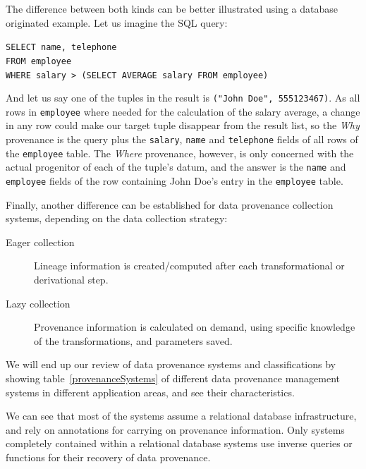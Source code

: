 		The difference between both kinds can be better illustrated
		using a database originated example.
		Let us imagine the SQL query:
		
		\begin{adjustwidth}{\parindent}{\parindent}
			\noindent\texttt{SELECT name, telephone\\
			FROM employee\\
			WHERE salary > (SELECT AVERAGE salary FROM employee)}
		\end{adjustwidth}
		
		 And let us say one of the tuples in the result is
		\texttt{("John Doe", 555123467)}. As all rows in
		\texttt{employee} where needed for the calculation of the
		salary average, a change in any row could make our target
		tuple disappear from the result list, so the \emph{Why}
		provenance is the query plus the \texttt{salary},
		\texttt{name} and \texttt{telephone} fields of all rows of
		the \texttt{employee} table. The \emph{Where} provenance,
		however, is only concerned with the actual progenitor of
		each of the tuple's datum, and the answer is the
		\texttt{name} and \texttt{employee} fields of the row
		containing John Doe's entry in the \texttt{employee} table.
		
		Finally, another difference can be established for
		data provenance collection systems, depending on the
		data collection strategy:
		
		\begin{description}
			\item[Eager collection] Lineage information is
			created/computed after each transformational or
			derivational step.
			
			\item[Lazy collection] Provenance information is
			calculated on demand, using specific knowledge of
			the transformations, and parameters saved.
		\end{description}
		
		We will end up our review
		of data provenance systems and classifications
		by showing table~\ref{provenanceSystems} of
		different data provenance management systems in different
		application areas, and see their characteristics.
		
		We can see that most
		of the systems assume a relational database
		infrastructure, and rely on annotations for carrying
		on provenance information. Only systems completely
		contained within a relational database systems use
		inverse queries or functions for their recovery of
		data provenance.
		
